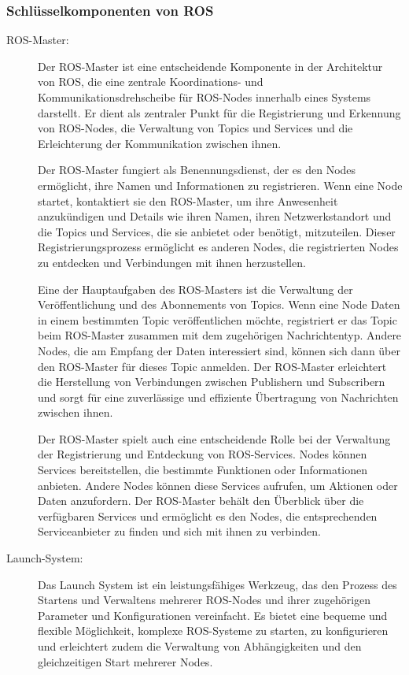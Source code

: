 \subsubsection{Schlüsselkomponenten von ROS} \label{schluesselkomponente:subsubsection}
\begin{description}
    \item[ROS-Master:] Der ROS-Master ist eine entscheidende Komponente in der Architektur von \ac{ROS}, die eine zentrale Koordinations- und Kommunikationsdrehscheibe für ROS-Nodes innerhalb eines Systems darstellt. Er dient als zentraler Punkt für die Registrierung und Erkennung von ROS-Nodes, die Verwaltung von Topics und Services und die Erleichterung der Kommunikation zwischen ihnen.

    Der ROS-Master fungiert als Benennungsdienst, der es den Nodes ermöglicht, ihre Namen und Informationen zu registrieren. Wenn eine Node startet, kontaktiert sie den ROS-Master, um ihre Anwesenheit anzukündigen und Details wie ihren Namen, ihren Netzwerkstandort und die Topics und Services, die sie anbietet oder benötigt, mitzuteilen. Dieser Registrierungsprozess ermöglicht es anderen Nodes, die registrierten Nodes zu entdecken und Verbindungen mit ihnen herzustellen.
    
    Eine der Hauptaufgaben des ROS-Masters ist die Verwaltung der Veröffentlichung und des Abonnements von Topics. Wenn eine Node Daten in einem bestimmten Topic veröffentlichen möchte, registriert er das Topic beim ROS-Master zusammen mit dem zugehörigen Nachrichtentyp. Andere Nodes, die am Empfang der Daten interessiert sind, können sich dann über den ROS-Master für dieses Topic anmelden. Der ROS-Master erleichtert die Herstellung von Verbindungen zwischen Publishern und Subscribern und sorgt für eine zuverlässige und effiziente Übertragung von Nachrichten zwischen ihnen.
    
    Der ROS-Master spielt auch eine entscheidende Rolle bei der Verwaltung der Registrierung und Entdeckung von ROS-Services. Nodes können Services bereitstellen, die bestimmte Funktionen oder Informationen anbieten. Andere Nodes können diese Services aufrufen, um Aktionen oder Daten anzufordern. Der ROS-Master behält den Überblick über die verfügbaren Services und ermöglicht es den Nodes, die entsprechenden Serviceanbieter zu finden und sich mit ihnen zu verbinden.

    \cite[vgl.][]{ros-master}
    
    \item[Launch-System:] Das Launch System ist ein leistungsfähiges Werkzeug, das den Prozess des Startens und Verwaltens mehrerer ROS-Nodes und ihrer zugehörigen Parameter und Konfigurationen vereinfacht. Es bietet eine bequeme und flexible Möglichkeit, komplexe \ac{ROS}-Systeme zu starten, zu konfigurieren und erleichtert zudem die Verwaltung von Abhängigkeiten und den gleichzeitigen Start mehrerer Nodes.


\end{description}
